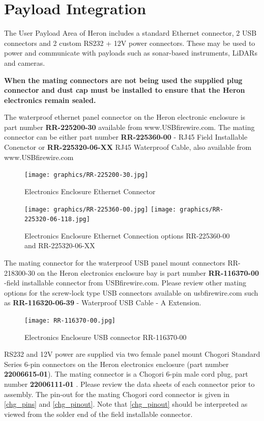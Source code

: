 \documentclass[]{clearpath-latex/clearpath-manual}
\begin{document}
\newpage

\section{Payload Integration}
The User Payload Area of Heron includes a standard Ethernet connector, 2 USB connectors and 2 custom RS232 + 12V power connectors. These may be used to power and communicate with payloads such as sonar-based instruments, LiDARs and cameras.

\textbf{When the mating connectors are not being used the supplied plug connector and dust cap must be installed to ensure that the Heron electronics remain sealed.}

The waterproof ethernet panel connector on the Heron electronic enclosure is part number \textbf{RR-225200-30} available from www.USBfirewire.com. The mating connector can be either part number \textbf{RR-225360-00} - RJ45 Field Installable Conenctor or \textbf{RR-225320-06-XX} RJ45 Waterproof Cable, also available from www.USBfirewire.com



\begin{figure}[h]
  \centering
  \texttt{[image: graphics/RR-225200-30.jpg]}
  \label{h_eth0}
  \caption{Electronics Enclosure Ethernet Connector}
\end{figure}

\begin{figure}[h]
  \centering
  \texttt{[image: graphics/RR-225360-00.jpg]}
  \texttt{[image: graphics/RR-225320-06-118.jpg]}

  \label{h_eth1}
  \caption{Electronics Enclosure Ethernet Connection options RR-225360-00 and RR-225320-06-XX}
\end{figure}

The mating connector for the waterproof USB panel mount connectors RR-218300-30 on the Heron electronics enclosure bay is part number \textbf{RR-116370-00} -field installable connector from USBfirewire.com. Please review other mating options for the screw-lock type USB connectors available on usbfirewire.com such as \textbf{RR-116320-06-39} - Waterproof USB Cable - A Extension.

\begin{figure}[h]
  \centering
  \texttt{[image: RR-116370-00.jpg]}
  \label{h_usb0}
  \caption{Electronics Enclosure USB connector RR-116370-00}
\end{figure}

RS232 and 12V power are supplied via two female panel mount Chogori Standard Series 6-pin connectors on the Heron electronics enclosure (part number \textbf{22006615-01}).  The mating connector is a Chogori 6-pin male cord plug, part number \textbf{22006111-01} . Please review the data sheets of each connector prior to assembly. The pin-out for the mating Chogori cord connector is given in \autoref{chg_pins} and \autoref{chg_pinout}. Note that \autoref{chg_pinout} should be interpreted as viewed from the solder end of the field installable connector.
\end{document}
